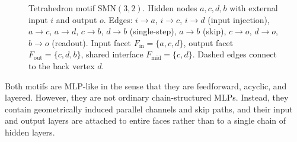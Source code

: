 \begin{figure}[ht]
\caption{Tetrahedron motif $\mathrm{SMN}(3,2)$. Hidden nodes $a,c,d,b$ with external input $i$ and output $o$. Edges: $i\to a$, $i\to c$, $i\to d$ (input injection), $a\to c$, $a\to d$, $c\to b$, $d\to b$ (single-step), $a\to b$ (skip), $c\to o$, $d\to o$, $b\to o$ (readout). Input facet $F_{\mathrm{in}}=\{a,c,d\}$, output facet $F_{\mathrm{out}}=\{c,d,b\}$, shared interface $F_{\mathrm{mid}}=\{c,d\}$. Dashed edges connect to the back vertex $d$.}
\label{fig:tetrahedron-motif}
\end{figure}

\begin{remark}
Both motifs are MLP-like in the sense that they are feedforward, acyclic, and layered. However, they are not ordinary chain-structured MLPs. Instead, they contain geometrically induced parallel channels and skip paths, and their input and output layers are attached to entire faces rather than to a single chain of hidden layers.
\end{remark}
